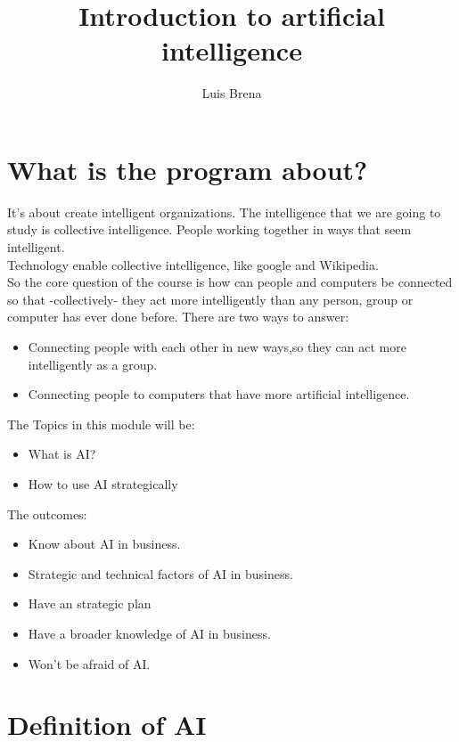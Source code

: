 \documentclass{article}
\title{Introduction to artificial intelligence}
\date{}
\author{Luis Brena}
\begin{document}
  \maketitle
  \newpage
\section{What is the program about?}
It's about create intelligent organizations. The intelligence that we are going to study is collective intelligence. People working together in ways that seem intelligent.\\
Technology enable collective intelligence, like google and Wikipedia.\\
So the core question of the course is how can people and computers be connected so that -collectively- they act more intelligently than any person, group or computer has ever done before.
There are two ways to answer:
  \begin{itemize}
    \item Connecting people with each other in new ways,so they can act more intelligently as a group.
    \item Connecting people to computers that have more artificial intelligence.
  \end{itemize}
The Topics in this module will be:
  \begin{itemize}
    \item What is AI?
    \item How to use AI strategically
  \end{itemize}
The outcomes:
  \begin{itemize}
  	\item Know about AI in business.
  	\item Strategic and technical factors of AI in business.
  	\item Have an strategic plan
  	\item Have a broader knowledge of AI in business.
  	\item Won't be afraid of AI.
  \end{itemize}
\section{Definition of AI}
\end{document}
